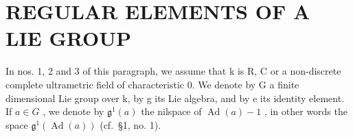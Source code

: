 \section{REGULAR ELEMENTS OF A LIE GROUP}

In nos. 1, 2 and 3 of this paragraph, we assume that k is R, C or a non-discrete complete ultrametric field of characteristic 0. We denote by G a finite dimensional Lie group over k, by g its Lie algebra, and by e its identity element. If \(a \in G\) , we denote by \(\mathfrak{g}^{1}(a)\) the nilspace of \(\operatorname{Ad}(a) - 1\) , in other words the space \(\mathfrak{g}^{1}(\operatorname{Ad}(a))\) (cf.~§1, no. 1).

